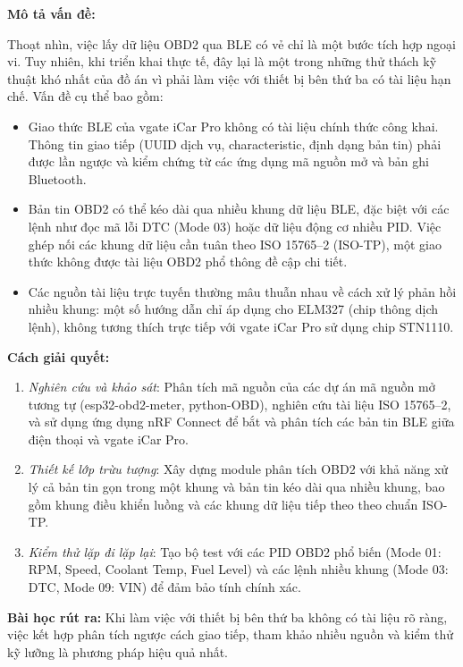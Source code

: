 \documentclass[a4paper]{extarticle}
\providecommand{\tightlist}{%
  \setlength{\itemsep}{0pt}\setlength{\parskip}{0pt}}
\begin{document}
\textbf{Mô tả vấn đề:}

Thoạt nhìn, việc lấy dữ liệu OBD2 qua BLE có vẻ chỉ là một bước tích hợp
ngoại vi. Tuy nhiên, khi triển khai thực tế, đây lại là một trong những
thử thách kỹ thuật khó nhất của đồ án vì phải làm việc với thiết bị bên
thứ ba có tài liệu hạn chế. Vấn đề cụ thể bao gồm:

\begin{itemize}
\tightlist
\item
  Giao thức BLE của vgate iCar Pro không có tài liệu chính thức công
  khai. Thông tin giao tiếp (UUID dịch vụ, characteristic, định dạng bản
  tin) phải được lần ngược và kiểm chứng từ các ứng dụng mã nguồn mở và
  bản ghi Bluetooth.
\item
  Bản tin OBD2 có thể kéo dài qua nhiều khung dữ liệu BLE, đặc biệt với
  các lệnh như đọc mã lỗi DTC (Mode 03) hoặc dữ
  liệu động cơ nhiều PID. Việc ghép nối các khung dữ liệu cần tuân theo
  ISO 15765--2 (ISO-TP), một giao thức không được tài liệu OBD2 phổ
  thông đề cập chi tiết.
\item
  Các nguồn tài liệu trực tuyến thường mâu thuẫn nhau về cách xử lý
  phản hồi nhiều khung: một số hướng dẫn chỉ áp dụng cho ELM327 (chip
  thông dịch lệnh), không tương thích trực tiếp với vgate iCar Pro sử dụng
  chip STN1110.
\end{itemize}

\textbf{Cách giải quyết:}

\begin{enumerate}
\def\labelenumi{\arabic{enumi}.}
\tightlist
\item
  \emph{Nghiên cứu và khảo sát}: Phân tích mã nguồn của các dự án mã
  nguồn mở tương tự (esp32-obd2-meter, python-OBD), nghiên cứu tài liệu
  ISO 15765--2, và sử dụng ứng dụng nRF Connect để bắt và phân tích các
  bản tin BLE giữa điện thoại và vgate iCar Pro.
\item
  \emph{Thiết kế lớp trừu tượng}: Xây dựng module phân tích OBD2 với khả
  năng xử lý cả bản tin gọn trong một khung và bản tin kéo dài qua nhiều
  khung, bao gồm khung điều khiển luồng và các khung dữ liệu tiếp theo
  theo chuẩn ISO-TP.
\item
  \emph{Kiểm thử lặp đi lặp lại}: Tạo bộ test với các PID OBD2 phổ biến
  (Mode 01: RPM, Speed, Coolant Temp, Fuel Level) và các lệnh
  nhiều khung (Mode 03: DTC, Mode 09: VIN) để đảm bảo tính chính xác.
\end{enumerate}

\textbf{Bài học rút ra:} Khi làm việc với thiết bị bên thứ ba không có
tài liệu rõ ràng, việc kết hợp phân tích ngược cách giao tiếp, tham
khảo nhiều nguồn và kiểm thử kỹ lưỡng là phương pháp hiệu quả nhất.
\end{document}
